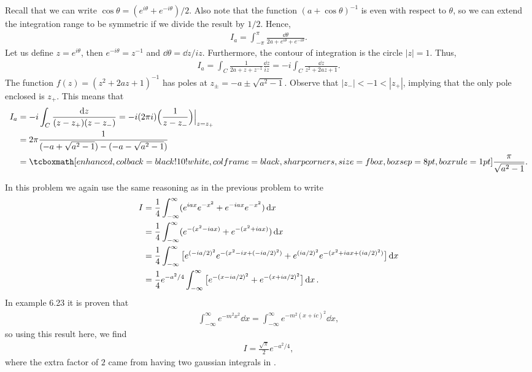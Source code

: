 Recall that we can write $\cos{\theta} = (e^{i\theta} + e^{-i\theta})/2$.
Also note that the function $(a + \cos{\theta})^{-1}$ is even with respect to $\theta$, so we can extend the integration range to be symmetric if we divide the result by $1/2$.
Hence,
\begin{eqnarray}
    \label{eq:rewrite-int-6.20}
    I_{a} = \int_{-\pi}^{\pi} \frac{\dd{\theta}}{2a + e^{i\theta} + e^{-i\theta}} 
.\end{eqnarray}
Let us define $z = e^{i\theta}$, then $e^{-i\theta} = z^{-1}$ and $\dd{\theta} = \dd{z}/iz$.
Furthermore, the contour of integration is the circle $|z|=1$.
Thus,
\begin{eqnarray}
    \label{eq:subs-int-6.20}
    I_{a} = \int_{C} \frac{1}{2a + z + z^{-1}} \frac{\dd{z}}{iz} = -i \int_{C} \frac{\dd{z}}{z^2 + 2az + 1}
.\end{eqnarray}
The function $f(z) = (z^2 + 2az + 1)^{-1}$ has poles at $z_{\pm} = -a \pm \sqrt{a^2 - 1}$.
Observe that $|z_{-}| < -1 < |z_{+}|$, implying that the only pole enclosed is $z_{+}$.
This means that 
\begin{align}
    \label{eq:label}
    I_{a} &= -i \int_{C} \frac{\dd{z}}{(z - z_{+})(z - z_{-})} = -i (2 \pi i)\Big( \frac{1}{z - z_{-}} \Big)\Big|_{z = z_{+}} \\
    &= 2 \pi \frac{1}{(-a + \sqrt{a^2 - 1}) - (-a - \sqrt{a^2 - 1})} \\
    &= \eqbox{ \frac{\pi}{\sqrt{a^2 - 1}} }
.\end{align}



In this problem we again use the same reasoning as in the previous problem to write
\begin{align}
    \label{eq:rewrite-6.26-int}
    I &= \frac{1}{4} \int_{-\infty}^{\infty} (e^{iax}e^{-x^2} + e^{-iax}e^{-x^2}) \dd{x} \notag \\
    &= \frac{1}{4} \int_{-\infty}^{\infty} (e^{-(x^2 - iax)} + e^{-(x^2 + iax)}) \dd{x} \notag \\
    &= \frac{1}{4} \int_{-\infty}^{\infty} \big[ e^{(-ia/2)^2}e^{-(x^2 - ix + (-ia/2)^2)} + e^{(ia/2)^2}e^{-(x^2 + iax + (ia/2)^2)} \big] \dd{x} \notag \\
    &= \frac{1}{4} e^{-a^2/4} \int_{-\infty}^{\infty} \big[ e^{-(x - ia/2)^2} + e^{-(x + ia/2)^2} \big] \dd{x}
.\end{align}
In example 6.23 it is proven that
\begin{eqnarray}
    \label{eq:integral-gauss}
    \int_{-\infty}^{\infty} e^{-m^2x^2} \dd{x} = \int_{-\infty}^{\infty} e^{-m^2(x + ic)^2} \dd{x}
,\end{eqnarray}
so using this result here, we find
\begin{eqnarray}
    \label{eq:result-6.26}
    I = \frac{\sqrt{\pi}}{2} e^{-a^2/4} 
,\end{eqnarray}
where the extra factor of $2$ came from having two gaussian integrals in .


